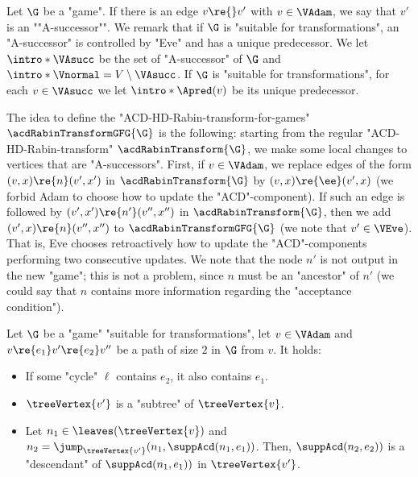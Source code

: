 \documentclass{theoretics}
\begin{document}
\AP Let $\G$ be a "game". If there is an edge $v\re{}v'$ with $v\in\VAdam$, we say that $v'$ is an ""A-successor"". We remark that if $\G$ is "suitable for transformations", an "A-successor" is controlled by "Eve" and has a unique predecessor. 
We let $\intro*\VAsucc$ be the set of "A-successor" of $\G$ and $\intro*\Vnormal = V\setminus \VAsucc$. If $\G$ is "suitable for transformations", for each $v\in \VAsucc$ we let $\intro*\Apred(v)$ be its unique predecessor.


The idea to define the "ACD-HD-Rabin-transform-for-games" $\acdRabinTransformGFG{\G}$ is the following: starting from the regular "ACD-HD-Rabin-transform" $\acdRabinTransform{\G}$, we make some local changes to vertices that are "A-successors". First, if $v\in \VAdam$, we replace edges of the form $(v,x)\re{n} (v',x')$ in $\acdRabinTransform{\G}$ by $(v,x)\re{\ee} (v',x)$ (we forbid Adam to choose how to update the "ACD"-component). If such an edge is followed by $(v',x')\re{n'} (v'',x'')$ in $\acdRabinTransform{\G}$, then we add $(v',x)\re{n} (v'',x'')$ to $\acdRabinTransformGFG{\G}$ (we note that $v'\in \VEve$). That is, Eve chooses retroactively how to update the "ACD"-components performing two consecutive updates. We note that the node $n'$ is not output in the new "game"; this is not a problem, since $n$ must be an "ancestor" of $n'$ (we could say that $n$ contains more information regarding the "acceptance condition").

\begin{remark}\label{rmk-app:bounded-edges}
	Let $\G$ be a "game" "suitable for transformations", let $v\in \VAdam$ and $v\re{e_1}v'\re{e_2}v''$ be a path of size $2$ in $\G$ from $v$. It holds:
	\begin{itemize}
		\item If some "cycle" $\ell$ contains $e_2$, it also contains $e_1$.
		\item $\treeVertex{v'}$ is a "subtree" of $\treeVertex{v}$.
		\item Let $n_1\in \leaves(\treeVertex{v})$ and $n_2 = \jump_{\treeVertex{v'}}(n_1, \suppAcd(n_1,e_1))$. Then, $\suppAcd(n_2,e_2))$ is a "descendant" of $\suppAcd(n_1,e_1))$ in $\treeVertex{v'}$.
	\end{itemize}  
\end{remark}
 
\end{document}
